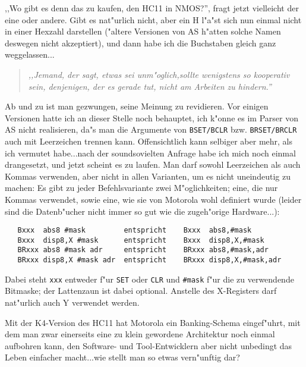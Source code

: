 \documentclass[12pt,a4paper,twoside]{report}
\newcommand{\tty}[1]{{\tt #1}}
\begin{document}
,,Wo gibt es denn das zu kaufen, den HC11 in NMOS?'', fragt jetzt vielleicht
der eine oder andere.  Gibt es nat"urlich nicht, aber ein H l"a"st sich nun
einmal nicht in einer Hexzahl darstellen ("altere Versionen von AS h"atten
solche Namen deswegen nicht akzeptiert), und dann habe ich die Buchstaben
gleich ganz weggelassen...
\par
\begin{quote}{\it
,,Jemand, der sagt, etwas sei unm"oglich,sollte wenigstens so kooperativ
sein, denjenigen, der es gerade tut, nicht am Arbeiten zu hindern.''
}\end{quote}
Ab und zu ist man gezwungen, seine Meinung zu revidieren.  Vor einigen
Versionen hatte ich an dieser Stelle noch behauptet, ich k"onne es im Parser
von AS nicht realisieren, da"s man die Argumente von \tty{BSET/BCLR} bzw.
\tty{BRSET/BRCLR} auch mit Leerzeichen trennen kann.  Offensichtlich kann
selbiger aber mehr, als ich vermutet habe...nach der soundsovielten Anfrage
habe ich mich noch einmal drangesetzt, und jetzt scheint es zu laufen.  Man
darf sowohl Leerzeichen als auch Kommas verwenden, aber nicht in allen
Varianten, um es nicht uneindeutig zu machen:  Es gibt zu jeder
Befehlsvariante zwei M"oglichkeiten; eine, die nur Kommas verwendet, sowie
eine, wie sie von Motorola wohl definiert wurde (leider sind die Datenb"ucher
nicht immer so gut wie die zugeh"orige Hardware...):
\begin{verbatim}
   Bxxx  abs8 #mask         entspricht    Bxxx  abs8,#mask
   Bxxx  disp8,X #mask      entspricht    Bxxx  disp8,X,#mask
   BRxxx abs8 #mask adr     entspricht    BRxxx abs8,#mask,adr
   BRxxx disp8,X #mask adr  entspricht    BRxxx disp8,X,#mask,adr
\end{verbatim}
Dabei steht \tty{xxx} entweder f"ur \tty{SET} oder \tty{CLR} und \tty{\#mask}
f"ur die zu verwendende Bitmaske; der Lattenzaun ist dabei optional.
Anstelle des X-Registers darf nat"urlich auch Y verwendet werden.

Mit der K4-Version des HC11 hat Motorola ein Banking-Schema eingef"uhrt,
mit dem man zwar einerseits eine zu klein gewordene Architektur noch
einmal aufbohren kann, den Software- und Tool-Entwicklern aber nicht
unbedingt das Leben einfacher macht...wie stellt man so etwas vern"unftig
dar?
\end{document}
